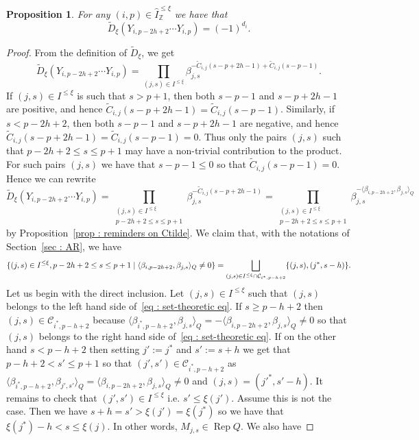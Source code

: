 \documentclass[12pt]{amsart}
\theoremstyle{plain}
\newtheorem{proposition}[theorem]{Proposition}
\theoremstyle{definition}
\numberwithin{equation}{section}
\newcommand\scalemath[2]{\scalebox{#1}{\mbox{\ensuremath{\displaystyle #2}}}}
\newcommand{\IxiZ}{\widehat{I}_{\mathbb{Z}}^{ \leq \xi}}
\newcommand{\tdxi}{\widetilde{D}_{\xi}}
\newcommand{\Ixi}{I^{\leq \xi}}
\DeclareMathOperator*{\rep}{Rep}
\begin{document}
  \begin{proposition} \label{prop : prod of Ys equal to pm 1}
For any $(i,p) \in \IxiZ$  we have that 
  $$ \tdxi(Y_{i,p-2h+2} \cdots Y_{i,p}) = (-1)^{d_i} . $$
  \end{proposition}

   \begin{proof}
    From the definition of $\tdxi$, we get 
 $$ \tdxi(Y_{i,p-2h+2} \cdots Y_{i,p}) =  \prod_{(j,s) \in \Ixi} \beta_{j,s}^{ - \tilde{C}_{i,j}(s-p+2h-1) + \tilde{C}_{i,j}(s-p-1)} . $$
  If $(j,s) \in \Ixi$ is such that $s>p+1$, then both $s-p-1$ and $s-p+2h-1$ are positive, and hence $\tilde{C}_{i,j}(s-p+2h-1) = \tilde{C}_{i,j}(s-p-1)$. Similarly, if $s<p-2h+2$, then both $s-p-1$ and $s-p+2h-1$ are negative, and hence $\tilde{C}_{i,j}(s-p+2h-1) = \tilde{C}_{i,j}(s-p-1) = 0$.  Thus only the pairs $(j,s)$ such that $p-2h+2 \leq s \leq p+1$ may have a non-trivial contribution to the product. For such pairs $(j,s)$ we have that $s-p-1 \leq 0$ so that $\tilde{C}_{i,j}(s-p-1)=0$. Hence we can rewrite 
  $$ \tdxi(Y_{i,p-2h+2} \cdots Y_{i,p}) =  \prod_{ \substack{ (j,s) \in \Ixi \\ p-2h+2 \leq s \leq p+1 }} \beta_{j,s}^{- \tilde{C}_{i,j}(s-p+2h-1)} = \prod_{ \substack{ (j,s) \in \Ixi \\ p-2h+2 \leq s \leq p+1}} \beta_{j,s}^{ -\langle \beta_{i,p-2h+2} , \beta_{j,s} \rangle_Q } $$
  by Proposition~\ref{prop : reminders on Ctilde}. We claim that, with the notations of Section~\ref{sec : AR}, we have 
  \begin{equation} \label{eq : set-theoretic eq}
\scalemath{0.92}{  \{ (j,s) \in \Ixi, p-2h+2 \leq s \leq p+1 \mid \langle \beta_{i,p-2h+2} , \beta_{j,s} \rangle_Q \neq 0 \} = \bigsqcup_{(j,s) \in 
 \Ixi \cap \mathcal{C}_{i^*,p-h+2} } \{ (j,s),(j^{*},s-h) \}. }
 \end{equation}
 Let us begin with the direct inclusion. Let $(j,s) \in \Ixi$ such that $(j,s)$ belongs to the left hand side of~\eqref{eq : set-theoretic eq}. If $s \geq p-h+2$ then $(j,s) \in \mathcal{C}_{i^*,p-h+2}$ because $\langle \beta_{i^*,p-h+2} , \beta_{j,s} \rangle_Q = - \langle \beta_{i,p-2h+2} , \beta_{j,s} \rangle_Q \neq 0$ so that $(j,s)$ belongs to the right hand side of~\eqref{eq : set-theoretic eq}. If on the other hand $s < p-h+2$ then setting $j' := j^*$ and $s' := s+h$ we get that $p-h+2 < s' \leq p+1$ so that $(j',s') \in \mathcal{C}_{i^*,p-h+2}$ as $\langle \beta_{i^*,p-h+2} , \beta_{j',s'} \rangle_Q  = \langle \beta_{i,p-2h+2} , \beta_{j,s} \rangle_Q \neq 0$ and $(j,s) = ({j'}^* , s'-h)$. It remains to check that $(j',s') \in \Ixi$ i.e.  $s' \leq \xi(j')$. Assume this is not the case. Then we have $s+h = s' > \xi(j') = \xi(j^*)$ so we have that $\xi(j^*)-h < s \leq \xi(j)$. In other words, $M_{j,s} \in \rep  Q$. We also have 

\end{proof}
\end{document}
